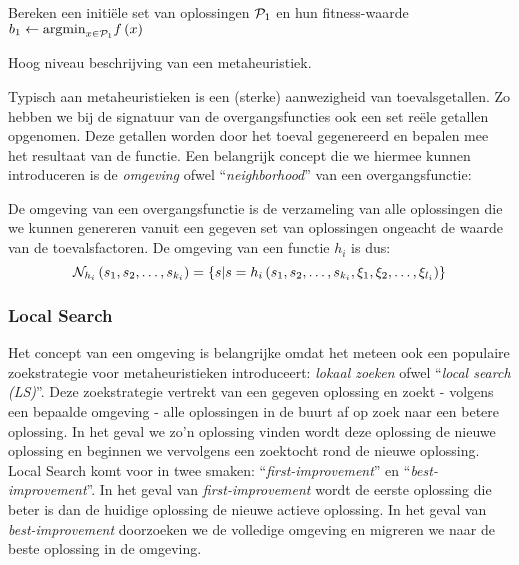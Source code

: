 \begin{algorithm}[H]
 Bereken een initi\"ele set van oplossingen $\mathcal{P}_1$ en hun fitness-waarde\;
 $b_1\leftarrow\displaystyle\mbox{argmin}_{x\in\mathcal{P}_1}{f\left(x\right)}$\;
 \caption{Hoog niveau beschrijving van een metaheuristiek\cite{DBLP:journals/jc/ShonkwilerV94}.}
\end{algorithm}

Typisch aan metaheuristieken is een (sterke) aanwezigheid van toevalsgetallen. Zo hebben we bij de signatuur van de overgangsfuncties ook een set re\"ele getallen opgenomen. Deze getallen worden door het toeval gegenereerd en bepalen mee het resultaat van de functie. Een belangrijk concept die we hiermee kunnen introduceren is de \emph{omgeving} ofwel ``\emph{neighborhood}'' van een overgangsfunctie:

\begin{definition}
De omgeving van een overgangsfunctie is de verzameling van alle oplossingen die we kunnen genereren vanuit een gegeven set van oplossingen ongeacht de waarde van de toevalsfactoren. De omgeving van een functie $h_i$ is dus:
\begin{equation}
\mathcal{N}_{h_i}\left(s_1,s_2,\ldots,s_{k_i}\right)=\left\{ s|s=h_i\left(s_1,s_2,\ldots,s_{k_i},\xi_1,\xi_2,\ldots,\xi_{l_i}\right)\right\}
\end{equation}
\end{definition}

\subsubsection{Local Search}
Het concept van een omgeving is belangrijke omdat het meteen ook een populaire zoekstrategie voor metaheuristieken introduceert: \emph{lokaal zoeken} ofwel ``\emph{local search (LS)}''. Deze zoekstrategie vertrekt van een gegeven oplossing en zoekt - volgens een bepaalde omgeving - alle oplossingen in de buurt af op zoek naar een betere oplossing. In het geval we zo'n oplossing vinden wordt deze oplossing de nieuwe oplossing en beginnen we vervolgens een zoektocht rond de nieuwe oplossing. Local Search komt voor in twee smaken: ``\emph{first-improvement}'' en ``\emph{best-improvement}''. In het geval van \emph{first-improvement} wordt de eerste oplossing die beter is dan de huidige oplossing de nieuwe actieve oplossing. In het geval van \emph{best-improvement} doorzoeken we de volledige omgeving en migreren we naar de beste oplossing in de omgeving.
